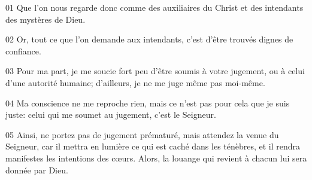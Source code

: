 01 Que l’on nous regarde donc comme des auxiliaires du Christ et des intendants des mystères de Dieu.

02 Or, tout ce que l’on demande aux intendants, c’est d’être trouvés dignes de confiance.

03 Pour ma part, je me soucie fort peu d’être soumis à votre jugement, ou à celui d’une autorité humaine; d’ailleurs, je ne me juge même pas moi-même.

04 Ma conscience ne me reproche rien, mais ce n’est pas pour cela que je suis juste: celui qui me soumet au jugement, c’est le Seigneur.

05 Ainsi, ne portez pas de jugement prématuré, mais attendez la venue du Seigneur, car il mettra en lumière ce qui est caché dans les ténèbres, et il rendra manifestes les intentions des cœurs. Alors, la louange qui revient à chacun lui sera donnée par Dieu.
